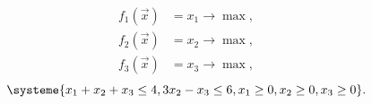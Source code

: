 \begin{align*} 
	f_1(\vec{x}) &= x_1 \to \max, \\
	f_2(\vec{x}) &= x_2 \to \max, \\
	f_3(\vec{x}) &= x_3 \to \max,
\end{align*}
\[
\systeme{
x_1 + x_2 + x_3 \leq 4,
3x_2 - x_3 \leq 6,
x_1 \geq 0,
x_2 \geq 0,
x_3 \geq 0
}
.
\]